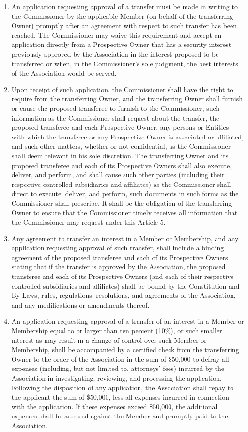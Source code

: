 \documentclass[]{book}
\providecommand{\tightlist}{%
  \setlength{\itemsep}{0pt}\setlength{\parskip}{0pt}}
\begin{document}
\begin{enumerate}
\def\labelenumi{(\alph{enumi})}
\tightlist
\item
  An application requesting approval of a transfer must be made in writing to the Commissioner by the applicable Member (on behalf of the transferring Owner) promptly after an agreement with respect to such transfer has been reached. The Commissioner may waive this requirement and accept an application directly from a Prospective Owner that has a security interest previously approved by the Association in the interest proposed to be transferred or when, in the Commissioner's sole judgment, the best interests of the Association would be served.
\item
  Upon receipt of such application, the Commissioner shall have the right to require from the transferring Owner, and the transferring Owner shall furnish or cause the proposed transferee to furnish to the Commissioner, such information as the Commissioner shall request about the transfer, the proposed transferee and each Prospective Owner, any persons or Entities with which the transferee or any Prospective Owner is associated or affiliated, and such other matters, whether or not confidential, as the Commissioner shall deem relevant in his sole discretion. The transferring Owner and its proposed transferee and each of its Prospective Owners shall also execute, deliver, and perform, and shall cause such other parties (including their respective controlled subsidiaries and affiliates) as the Commissioner shall direct to execute, deliver, and perform, such documents in such forms as the Commissioner shall prescribe. It shall be the obligation of the transferring Owner to ensure that the Commissioner timely receives all information that the Commissioner may request under this Article 5.
\item
  Any agreement to transfer an interest in a Member or Membership, and any application requesting approval of such transfer, shall include a binding agreement of the proposed transferee and each of its Prospective Owners stating that if the transfer is approved by the Association, the proposed transferee and each of its Prospective Owners (and each of their respective controlled subsidiaries and affiliates) shall be bound by the Constitution and By-Laws, rules, regulations, resolutions, and agreements of the Association, and any modifications or amendments thereof.
\item
  An application requesting approval of a transfer of an interest in a Member or Membership equal to or larger than ten percent (10\%), or such smaller interest as may result in a change of control over such Member or Membership, shall be accompanied by a certified check from the transferring Owner to the order of the Association in the sum of \$50,000 to defray all expenses (including, but not limited to, attorneys' fees) incurred by the Association in investigating, reviewing, and processing the application. Following the disposition of any application, the Association shall repay to the applicant the sum of \$50,000, less all expenses incurred in connection with the application. If these expenses exceed \$50,000, the additional expenses shall be assessed against the Member and promptly paid to the Association.

\end{enumerate}
\end{document}
